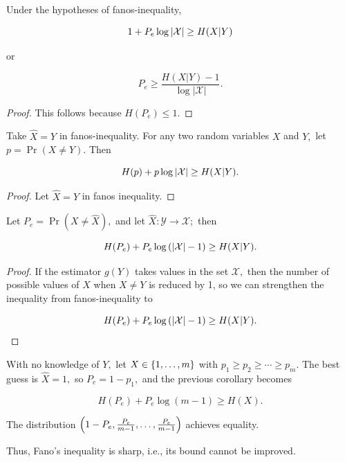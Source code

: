 \documentclass{article}
\begin{document}
\begin{corollary}
        Under the hypotheses of \@{fanos-inequality},

	\[ 1 + P_e \log{\left| \mathcal{X} \right|} \geq H(X|Y) \]

	or

	\[ P_e \geq \frac{H(X|Y) - 1}{\log{|\mathcal{X}|}}. \]
\end{corollary}
\begin{proof}
This follows because $H(P_e) \leq 1.$
\end{proof}

\begin{corollary}
Take $\hat{X} = Y$ in \@{fanos-inequality}.
	For any two \@{random variables} $X$ and $Y,$ let $p = \Pr{(X \neq Y)}.$ Then

	\[ H(p) + p \log{\left| \mathcal{X} \right|} \geq H(X|Y). \]
\end{corollary}
\begin{proof}
	Let $\hat{X} = Y$ in \@{fanos inequality}. 
\end{proof}

\begin{corollary}
	Let $P_e = \Pr{(X \neq \hat{X})},$ and let $\hat{X} : \mathcal{Y} \to \mathcal{X};$ then

	\[ H(P_e) + P_e \log{(\left| \mathcal{X} \right| - 1)} \geq H(X|Y). \]
\end{corollary}

\begin{proof}
	If the \@{estimator} $g(Y)$ takes values in the set $\mathcal{X},$ then the number of possible values of $X$ when $X \neq Y$ is reduced by 1, so we can strengthen the inequality from \@{fanos-inequality} to


	\[ H(P_e) + P_e \log{(\left| \mathcal{X} \right| - 1)} \geq H(X|Y). \]
\end{proof}

\begin{remark}
	With no knowledge of $Y,$ let $X \in \left\{ 1, \ldots, m \right\}$ with $p_1 \geq p_2 \geq \cdots \geq p_m.$ The best guess is $\hat{X} = 1,$ so $P_e = 1 - p_1,$ and the previous corollary becomes

	\[ H(P_e) + P_e \log{(m - 1)} \geq H(X). \]

	The distribution $\left(1 - P_e, \frac{P_e}{m-1}, \ldots, \frac{P_e}{m-1}\right)$ achieves equality.

	Thus, \@{Fano's inequality} is \@{sharp}, i.e., its bound cannot be improved.
\end{remark}
\end{document}
